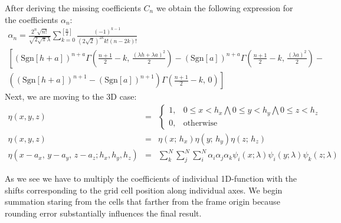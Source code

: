 After deriving the missing coefficients $C_n$ we obtain the following expression for the coefficients $\alpha_n$:
\begin{eqnarray*}
 \alpha_{n}=\frac{2^{n}\sqrt{n!}}{\sqrt{2\sqrt{\pi}\lambda}}\sum_{k=0}^{\left[\frac{n}{2}\right]}\frac{(-1)^{k-1}}{\left(2\sqrt{2}\right)^{2k}k!(n-2k)!}\\
 \left[\left(\mbox{Sgn}[h+a]\right)^{n+a}\Gamma\left(\frac{n+1}{2}-k,\,\frac{\left(\lambda h+\lambda a\right)^{2}}{2}\right)-\left(\mbox{Sgn}[a]\right)^{n+a}\Gamma\left(\frac{n+1}{2}-k,\,\frac{\left(\lambda a\right)^{2}}{2}\right)-\right.\\
 \left.\left(\left(\mbox{Sgn}[h+a]\right)^{n+1}-\left(\mbox{Sgn}[a]\right)^{n+1}\right)\Gamma\left(\frac{n+1}{2}-k,\,0\right)\right]
\end{eqnarray*}
Next, we are moving to the 3D case:
\begin{eqnarray*}
 \eta(x,y,z)&=&
 \begin{cases}
1, & 0\leq x<h_{x}\bigwedge0\leq y<h_{y}\bigwedge0\leq z<h_{z}\\
0, & \mbox{otherwise}
\end{cases} \\
\eta(x,y,z)&=&\eta(x;\, h_{x})\eta(y;\, h_{y})\eta(z;\, h_{z})\\
\eta(x-a_{x},\, y-a_{y},\, z-a_{z};h_{x},h_{y},h_{z})&=&\sum_{k}^{N}\sum_{j}^{N}\sum_{i}^{N}\alpha_{i}\alpha_{j}\alpha_{k}\psi_{i}(x;\lambda)\psi_{i}(y;\lambda)\psi_{k}(z;\lambda)
\end{eqnarray*}

As we see we have to multiply the coefficients of individual 1D-function with the shifts corresponding to the grid cell position along individual axes. We begin summation staring from the cells
that farther from the frame origin because rounding error substantially influences the final result.

